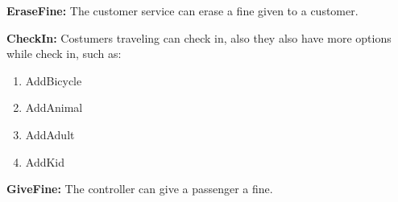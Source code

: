 \textbf{EraseFine:}
The customer service can erase a fine given to a customer.

\textbf{CheckIn:}
Costumers traveling can check in, also they also have more options while check in, such as:
\begin{enumerate}
	\item AddBicycle
	\item AddAnimal
	\item AddAdult
	\item AddKid
\end{enumerate}

\textbf{GiveFine:}
The controller can give a passenger a fine.